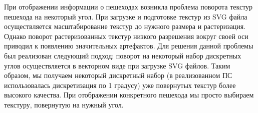 При отображении информации о пешеходах возникла проблема поворота текстур пешехода на некоторый угол.
При загрузке и подготовке текстур из SVG файла осуществляется масштабирование текстур до нужного размера и растеризация.
Однако поворот растеризованных текстур низкого разрешения вокруг своей оси приводил к появлению значительных артефактов.
Для решения данной проблемы был реализован следующий подход: поворот на некоторый набор дискретных углов осуществляется в векторном виде при загрузке SVG файлов.
Таким образом, мы получаем некоторый дискретный набор (в реализованном ПС использовалась дискретизация по 1 градусу) уже повернутых текстур более высокого качества.
При отображении конкретного пешехода мы просто выбираем текстуру, повернутую на нужный угол.

